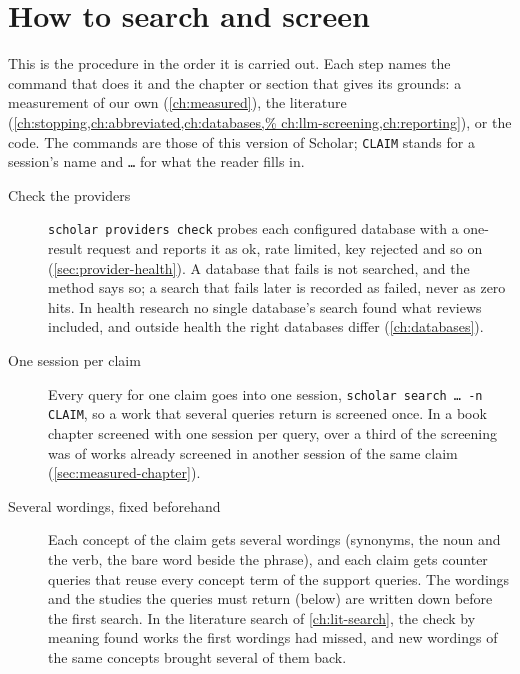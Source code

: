 \chapter{How to search and screen}
\label{ch:procedure}

This is the procedure in the order it is carried out.
Each step names the command that does it and the chapter or section
that gives its grounds: a measurement of our own (\cref{ch:measured}),
the literature (\cref{ch:stopping,ch:abbreviated,ch:databases,%
ch:llm-screening,ch:reporting}), or the code.
The commands are those of this version of Scholar; \texttt{CLAIM} stands
for a session's name and \texttt{\dots} for what the reader fills in.

\begingroup\raggedright
\begin{description}
\item[Check the providers]
  \texttt{scholar providers check} probes each configured database with
  a one-result request and reports it as ok, rate limited, key rejected
  and so on (\cref{sec:provider-health}).
  A database that fails is not searched, and the method says so; a
  search that fails later is recorded as failed, never as zero hits.
  In health research no single database's search found what reviews
  included, and outside health the right databases differ
  (\cref{ch:databases}).

\item[One session per claim]
  Every query for one claim goes into one session,
  \texttt{scholar search \dots\ -n CLAIM}, so a work that several queries
  return is screened once.
  In a book chapter screened with one session per query, over a third of
  the screening was of works already screened in another session of the
  same claim (\cref{sec:measured-chapter}).

\item[Several wordings, fixed beforehand]
  Each concept of the claim gets several wordings (synonyms, the noun and
  the verb, the bare word beside the phrase), and each claim gets counter
  queries that reuse every concept term of the support queries.
  The wordings and the studies the queries must return
  (below) are written down before the first search.
  In the literature search of \cref{ch:lit-search}, the check by meaning
  found works the first wordings had missed, and new wordings of the
  same concepts brought several of them back.


\end{description}
